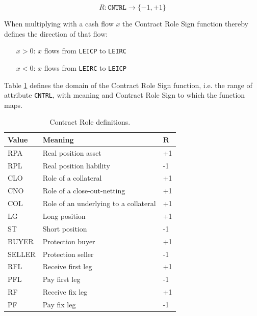 \documentclass[9pt,oneside]{amsart}
\newcommand{\attr}[1]{\texttt{#1}}
\begin{document}
\begin{multicols}{2}
\[
	R : \attr{CNTRL} \rightarrow \{-1, +1 \}
\]

When multiplying with a cash flow $x$ the Contract Role Sign function thereby defines the direction of that flow:

\begin{itemize}
	\item[$x>0$:] $x$ flows from \attr{LEICP} to \attr{LEIRC}
	
	\item[$x<0$:] $x$ flows from \attr{LEIRC} to \attr{LEICP}
\end{itemize}

Table \ref{tbl:cntrl} defines the domain of the Contract Role Sign function, i.e. the range of attribute \attr{CNTRL}, with meaning and Contract Role Sign to which the function maps.




\begin{table}[H]
	\centering
	\begin{tabular}{| p{0.5in}p{1.5in}p{0.2in} |}
	\hline
	\textbf{Value} & \textbf{Meaning} & $\textbf{R}$ \\
	\hline
	RPA & Real position asset & +1 \\
	\hline
	RPL & Real position liability & -1 \\
	\hline
	CLO & Role of a collateral & +1 \\
	\hline
	CNO & Role of a close-out-netting & +1 \\
	\hline
	COL & Role of an underlying to a collateral & +1 \\
	\hline
	LG & Long position & +1 \\
	\hline
	ST & Short position & -1 \\
	\hline
	BUYER & Protection buyer & +1 \\
	\hline
	SELLER & Protection seller & -1 \\
	\hline
	RFL & Receive first leg & +1 \\
	\hline
	PFL & Pay first leg & -1 \\
	\hline
	RF & Receive fix leg & +1 \\
	\hline
	PF & Pay fix leg & -1 \\
	\hline
	\end{tabular}
	\caption{Contract Role definitions.}
	\label{tbl:cntrl}
\end{table}





\end{multicols}
\end{document}
